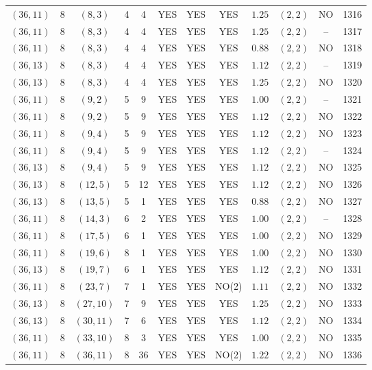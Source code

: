 \begin{longtable}{|c|c|c|c|c|c|c|c|c|c|c|c|}
$(36,11)$ & 8 & $(8,3)$ & 4 & 4 & YES & YES & YES & $1.25$ & $(2,2)$ & NO & 1316\\
$(36,11)$ & 8 & $(8,3)$ & 4 & 4 & YES & YES & YES & $1.25$ & $(2,2)$ & -- & 1317\\
$(36,11)$ & 8 & $(8,3)$ & 4 & 4 & YES & YES & YES & $0.88$ & $(2,2)$ & NO & 1318\\
$(36,13)$ & 8 & $(8,3)$ & 4 & 4 & YES & YES & YES & $1.12$ & $(2,2)$ & -- & 1319\\
$(36,13)$ & 8 & $(8,3)$ & 4 & 4 & YES & YES & YES & $1.25$ & $(2,2)$ & NO & 1320\\
$(36,11)$ & 8 & $(9,2)$ & 5 & 9 & YES & YES & YES & $1.00$ & $(2,2)$ & -- & 1321\\
$(36,11)$ & 8 & $(9,2)$ & 5 & 9 & YES & YES & YES & $1.12$ & $(2,2)$ & NO & 1322\\
$(36,11)$ & 8 & $(9,4)$ & 5 & 9 & YES & YES & YES & $1.12$ & $(2,2)$ & NO & 1323\\
$(36,11)$ & 8 & $(9,4)$ & 5 & 9 & YES & YES & YES & $1.12$ & $(2,2)$ & -- & 1324\\
$(36,13)$ & 8 & $(9,4)$ & 5 & 9 & YES & YES & YES & $1.12$ & $(2,2)$ & NO & 1325\\
$(36,13)$ & 8 & $(12,5)$ & 5 & 12 & YES & YES & YES & $1.12$ & $(2,2)$ & NO & 1326\\
$(36,13)$ & 8 & $(13,5)$ & 5 & 1 & YES & YES & YES & $0.88$ & $(2,2)$ & NO & 1327\\
$(36,11)$ & 8 & $(14,3)$ & 6 & 2 & YES & YES & YES & $1.00$ & $(2,2)$ & -- & 1328\\
$(36,11)$ & 8 & $(17,5)$ & 6 & 1 & YES & YES & YES & $1.00$ & $(2,2)$ & NO & 1329\\
$(36,11)$ & 8 & $(19,6)$ & 8 & 1 & YES & YES & YES & $1.00$ & $(2,2)$ & NO & 1330\\
$(36,13)$ & 8 & $(19,7)$ & 6 & 1 & YES & YES & YES & $1.12$ & $(2,2)$ & NO & 1331\\
$(36,11)$ & 8 & $(23,7)$ & 7 & 1 & YES & YES & NO(2) & $1.11$ & $(2,2)$ & NO & 1332\\
$(36,13)$ & 8 & $(27,10)$ & 7 & 9 & YES & YES & YES & $1.25$ & $(2,2)$ & NO & 1333\\
$(36,13)$ & 8 & $(30,11)$ & 7 & 6 & YES & YES & YES & $1.12$ & $(2,2)$ & NO & 1334\\
$(36,11)$ & 8 & $(33,10)$ & 8 & 3 & YES & YES & YES & $1.00$ & $(2,2)$ & NO & 1335\\
$(36,11)$ & 8 & $(36,11)$ & 8 & 36 & YES & YES & NO(2) & $1.22$ & $(2,2)$ & NO & 1336\\

\end{longtable}
